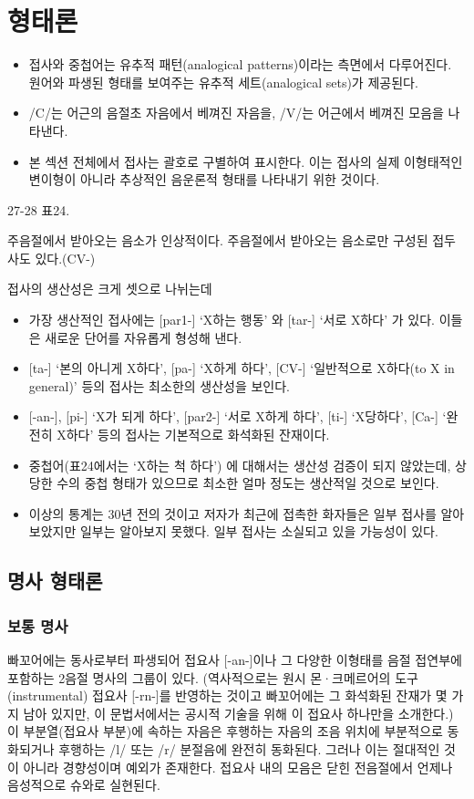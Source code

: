 \setcounter{section}{2}

\section{형태론}
\begin{itemize}
\item 접사와 중첩어는 유추적 패턴(analogical patterns)이라는 측면에서 다루어진다. 원어와 파생된 형태를 보여주는 유추적 세트(analogical sets)가 제공된다.

\item /C/는 어근의 음절초 자음에서 베껴진 자음을, /V/는 어근에서 베껴진 모음을 나타낸다.
\item 본 섹션 전체에서 접사는 괄호로 구별하여 표시한다. 이는 접사의 실제 이형태적인 변이형이 아니라 추상적인 음운론적 형태를 나타내기 위한 것이다.
\end{itemize}

27-28 표24.

주음절에서 받아오는 음소가 인상적이다. 주음절에서 받아오는 음소로만 구성된 접두사도 있다.(CV-)

접사의 생산성은 크게 셋으로 나뉘는데 
\begin{itemize}
\item 가장 생산적인 접사에는 [par1-] `X하는 행동' 와 [tar-] `서로 X하다' 가 있다. 이들은 새로운 단어를 자유롭게 형성해 낸다.
\item{ [ta-] `본의 아니게 X하다', [pa-] `X하게 하다', [CV-] `일반적으로 X하다(to X in general)' 등의 접사는 최소한의 생산성을 보인다.}
\item{ [-an-], [pi-] `X가 되게 하다', [par2-] `서로 X하게 하다', [ti-] `X당하다', [Ca-] `완전히 X하다' 등의 접사는 기본적으로 화석화된 잔재이다.}
\item 중첩어(표24에서는 `X하는 척 하다') 에 대해서는 생산성 검증이 되지 않았는데, 상당한 수의 중첩 형태가 있으므로 최소한 얼마 정도는 생산적일 것으로 보인다.
\item 이상의 통계는 30년 전의 것이고 저자가 최근에 접촉한 화자들은 일부 접사를 알아보았지만 일부는 알아보지 못했다. 일부 접사는 소실되고 있을 가능성이 있다.
\end{itemize}

\subsection{명사 형태론}
\subsubsection{보통 명사}
빠꼬어에는 동사로부터 파생되어 접요사 [-an-]이나 그 다양한 이형태를 음절 접연부에 포함하는 2음절 명사의 그룹이 있다. (역사적으로는 원시 몬·크메르어의 도구(instrumental) 접요사 [-rn-]를 반영하는 것이고 빠꼬어에는 그 화석화된 잔재가 몇 가지 남아 있지만, 이 문법서에서는 공시적 기술을 위해 이 접요사 하나만을 소개한다.) 
이 부분열(접요사 부분)에 속하는 자음은 후행하는 자음의 조음 위치에 부분적으로 동화되거나 후행하는 /l/ 또는 /r/ 분절음에 완전히 동화된다. 그러나 이는 절대적인 것이 아니라 경향성이며 예외가 존재한다. 접요사 내의 모음은 닫힌 전음절에서 언제나 음성적으로 슈와로 실현된다. 

